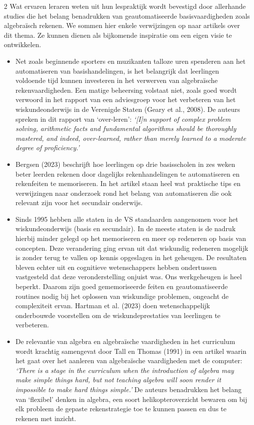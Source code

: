 \begin{multicols}{2}
Wat ervaren leraren weten uit hun lespraktijk wordt bevestigd door allerhande studies die het belang benadrukken van geautomatiseerde basisvaardigheden zoals algebraïsch rekenen. We sommen hier enkele verwijzingen op naar artikels over dit thema. Ze kunnen dienen als bijkomende inspiratie om een eigen visie te ontwikkelen.
\begin{itemize}
	\item Net zoals beginnende sporters en muzikanten talloze uren spenderen aan het automatiseren van 	basishandelingen, is het belangrijk dat leerlingen voldoende tijd kunnen investeren in het verwerven van algebraïsche rekenvaardigheden. Een matige beheersing volstaat niet, zoals goed wordt verwoord in het rapport van een adviesgroep voor het verbeteren van het wiskundeonderwijs in de Verenigde Staten (Geary et al., 2008). De auteurs spreken in dit rapport van ‘over-leren’: \emph{`[I]n support of complex problem solving, arithmetic facts and fundamental algorithms should be thoroughly mastered, and indeed, over-learned, rather than merely learned to a moderate degree of proficiency.'}
	\item Bergsen (2023) beschrijft hoe leerlingen op drie basisscholen in zes weken beter leerden rekenen door dagelijks rekenhandelingen te automatiseren en rekenfeiten te memoriseren. In het artikel staan heel wat praktische tips en verwijzingen naar onderzoek rond het belang van automatiseren die ook relevant zijn voor het secundair onderwijs.
	\item Sinds 1995 hebben alle staten in de VS standaarden aangenomen voor het wiskundeonderwijs (basis en secundair). In de meeste staten is de nadruk hierbij minder gelegd op het memoriseren en meer op redeneren op basis van concepten. Deze verandering ging ervan uit dat wiskundig redeneren mogelijk is zonder terug te vallen op kennis opgeslagen in het geheugen. De resultaten bleven echter uit en cognitieve wetenschappers hebben ondertussen vastgesteld dat deze veronderstelling onjuist was. Ons werkgeheugen is heel beperkt. Daarom zijn goed gememoriseerde feiten en geautomatiseerde routines nodig bij het oplossen van wiskundige problemen, ongeacht de complexiteit ervan. Hartman et al. (2023) doen wetenschappelijk onderbouwde voorstellen om de wiskundeprestaties van leerlingen te verbeteren.	
	\item De relevantie van algebra en algebraïsche vaardigheden in het curriculum wordt krachtig samengevat door Tall en Thomas (1991) in een artikel waarin het gaat over het aanleren van algebraïsche vaardigheden met de computer: \emph{`There is a stage in the curriculum when the introduction of algebra may make simple things hard, but not teaching algebra will soon render it impossible to make hard things simple.'}   De auteurs benadrukken het belang van `flexibel' denken in algebra, een soort helikopteroverzicht bewaren om bij elk probleem de gepaste rekenstrategie toe te kunnen passen en dus te rekenen met inzicht.
\end{itemize}






\end{multicols}

